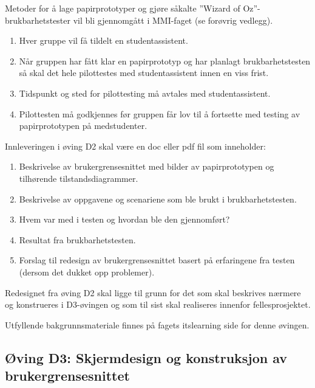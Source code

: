 Metoder for å lage papirprototyper og gjøre såkalte ”Wizard of Oz”-brukbarhetstester vil bli gjennomgått i MMI-faget (se forøvrig vedlegg).

\begin{enumerate}

\item
Hver gruppe vil få tildelt en studentassistent.

\item
Når gruppen har fått klar en papirprototyp og har planlagt brukbarhetstesten så skal det hele pilottestes med studentassistent innen en viss frist.

\item
Tidspunkt og sted for pilottesting må avtales med studentassistent.

\item
Pilottesten må godkjennes før gruppen får lov til å fortsette med testing av papirprototypen på medstudenter.

\end{enumerate}

Innleveringen i øving D2 skal være en doc eller pdf fil som inneholder:

\begin{enumerate}

\item
Beskrivelse av brukergrensesnittet med bilder av papirprototypen og tilhørende tilstandsdiagrammer.

\item
Beskrivelse av oppgavene og scenariene som ble brukt i brukbarhetstesten.

\item
Hvem var med i testen og hvordan ble den gjennomført?

\item
Resultat fra brukbarhetstesten.

\item
Forslag til redesign av brukergrensesnittet basert på erfaringene fra testen (dersom det dukket opp problemer).

\end{enumerate}

Redesignet fra øving D2 skal ligge til grunn for det som skal beskrives nærmere og konstrueres i D3-øvingen og som til sist skal realiseres innenfor fellesprosjektet. 

Utfyllende bakgrunnsmateriale finnes på fagets itslearning side for denne øvingen.

\subsection{Øving D3: Skjermdesign og konstruksjon av brukergrensesnittet}

